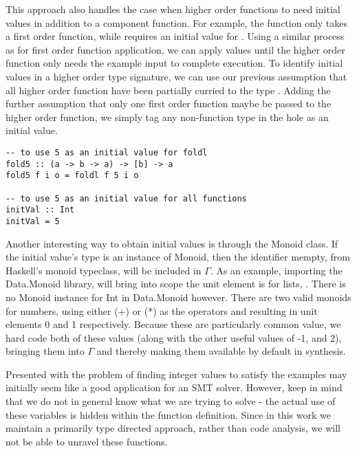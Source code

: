 This approach also handles the case when higher order functions to need initial values in addition to a component function.
For example, the  function only takes a first order function, while  requires an initial value for .
Using a similar process as for first order function application, we can apply values until the higher order function only needs the example input to complete execution.
To identify initial values in a higher order type signature, we can use our previous assumption that all higher order function have been partially curried to the type \codeinline{_ -> *-> *}. 
Adding the further assumption that only one first order function maybe be passed to the higher order function, we simply tag any non-function type in the hole as an initial value.

\begin{lstlisting}[caption=adding default initial values]
-- to use 5 as an initial value for foldl
fold5 :: (a -> b -> a) -> [b] -> a
fold5 f i o = foldl f 5 i o

-- to use 5 as an initial value for all functions
initVal :: Int
initVal = 5
\end{lstlisting}

Another interesting way to obtain initial values is through the Monoid class.
If the initial value's type is an instance of Monoid, then the identifier mempty, from Haskell's monoid typeclass\cite{monoid}, will be included in $\Gamma$.
As an example, importing the Data.Monoid library, will bring into scope the unit element is for lists, .
There is no Monoid instance for Int in Data.Monoid however. 
There are two valid monoids for numbers, using either (+) or (*) as the operators and resulting in unit elements 0 and 1 respectively. 
Because these are particularly common value,  we hard code both of these values (along with the other useful values of -1, and 2), bringing them into $\Gamma$ and thereby making them available by default in synthesis.

Presented with the problem of finding integer values to satisfy the examples may initially seem like a good application for an SMT solver.
However, keep in mind that we do not in general know what we are trying to solve - the actual use of these variables is hidden within the function definition.
Since in this work we maintain a primarily type directed approach, rather than code analysis, we will not be able to unravel these functions.

